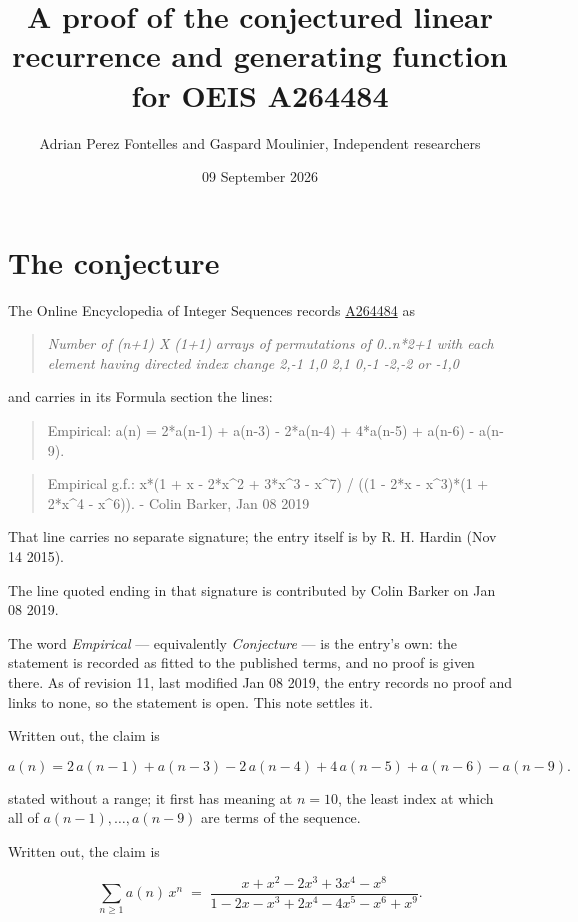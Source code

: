 \documentclass[11pt]{article}
\title{A proof of the conjectured linear recurrence and generating function for OEIS A264484}
\author{Adrian Perez Fontelles and Gaspard Moulinier, Independent researchers}
\date{09 September 2026}
\theoremstyle{definition}
\begin{document}
\maketitle
\section{The conjecture}

The Online Encyclopedia of Integer Sequences records \href{https://oeis.org/A264484}{A264484} as

\begin{quote}\itshape Number of (n+1) X (1+1) arrays of permutations of 0..n*2+1 with each element having directed index change 2,-1 1,0 2,1 0,-1 -2,-2 or -1,0\end{quote}

and carries in its Formula section the lines:

\begin{quote}\ttfamily Empirical: a(n) = 2*a(n-1) + a(n-3) - 2*a(n-4) + 4*a(n-5) + a(n-6) - a(n-9).\end{quote}

\begin{quote}\ttfamily Empirical g.f.: x*(1 + x - 2*x\textasciicircum{}2 + 3*x\textasciicircum{}3 - x\textasciicircum{}7) / ((1 - 2*x - x\textasciicircum{}3)*(1 + 2*x\textasciicircum{}4 - x\textasciicircum{}6)). - Colin Barker, Jan 08 2019\end{quote}

That line carries no separate signature; the entry itself is by R. H. Hardin (Nov 14 2015).

The line quoted ending in that signature is contributed by Colin Barker on Jan 08 2019.

The word {\itshape Empirical} --- equivalently {\itshape Conjecture} --- is the entry's own: the statement is recorded as fitted to the published terms, and no proof is given there. As of revision 11, last modified Jan 08 2019, the entry records no proof and links to none, so the statement is open. This note settles it.

Written out, the claim is

\[a(n) = 2\,a(n-1) + a(n-3) - 2\,a(n-4) + 4\,a(n-5) + a(n-6) - a(n-9).\]

stated without a range; it first has meaning at $n = 10$, the least index at which all of $a(n-1),\dots,a(n-9)$ are terms of the sequence.

Written out, the claim is

\[\sum_{n \ge 1} a(n)\,x^n \;=\; \frac{x + x^{2} - 2x^{3} + 3x^{4} - x^{8}}{1 - 2x - x^{3} + 2x^{4} - 4x^{5} - x^{6} + x^{9}}.\]
\end{document}
